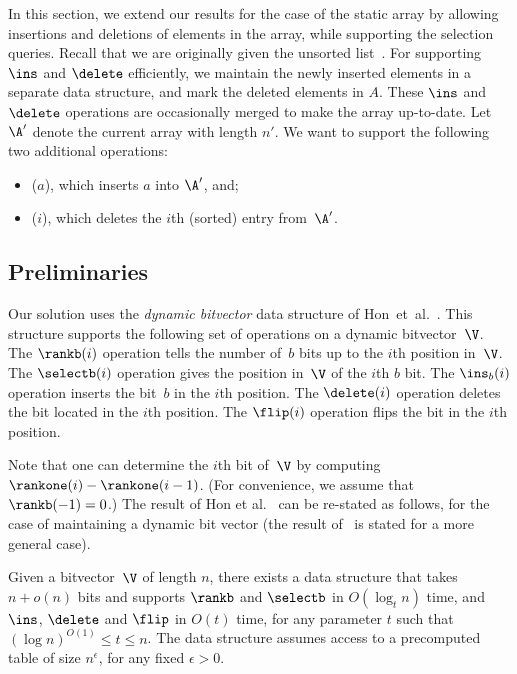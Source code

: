 In this section, we extend our results for the case of the static array by allowing 
insertions and deletions of elements in the array, while supporting the selection 
queries. Recall that we are originally given the unsorted list~\A. 
For supporting $\ins$ and $\delete$ efficiently, we maintain the newly inserted elements in a
separate data structure, and mark the deleted elements in $A$. These $\ins$ and $\delete$ operations are 
occasionally merged to make the array up-to-date. 
Let $\A'$ denote the current array with length $n'$. We want to support the following 
two additional operations:
\begin{itemize}
	\item \ins($a$), which inserts $a$ into $\A'$, and;
	\item \del($i$), which deletes the $i$th (sorted) entry from~$\A'$.
\end{itemize}

\subsection{Preliminaries}
\label{section:dynamic-preliminaries}

Our solution uses the \emph{dynamic bitvector} data structure of Hon~et~al.~\cite{hon:dynamic-bitvector}. This structure supports the following set of operations on a dynamic bitvector~$\V$. 
The $\rankb(i)$ operation tells the number of~$b$ bits up to the $i$th position in~$\V$.
The $\selectb(i)$ operation gives the position in~$\V$ of the $i$th $b$ bit.
The $\ins_b(i)$ operation inserts the bit~$b$ in the $i$th position.
The $\delete(i)$ operation deletes the bit located in the $i$th position.
The $\flip(i)$ operation flips the bit in the $i$th position.


Note that one can determine the $i$th bit of~$\V$ by computing $\rankone(i) - \rankone(i-1)$. (For convenience, we assume that $\rankb(-1) = 0$.)
The result of Hon et al.~\cite[Theorem~1]{hon:dynamic-bitvector} can be re-stated as follows, for the case of maintaining a dynamic bit vector (the result of~\cite{hon:dynamic-bitvector} is stated
for a more general case).

\begin{lemma}
\label{lem:dynamic-bitvector}
Given a bitvector~$\V$ of length $n$, there exists a data structure that takes $n + o(n)$ bits and 
supports $\rankb$ and $\selectb$ in $O(\log_t n)$ time, and $\ins$, $\delete$ and $\flip$ in
$O(t)$ time, for any parameter $t$ such that $(\log n)^{O(1)} \le t \le n$. The data structure 
assumes access to a precomputed table of size $n^{\epsilon}$, for any fixed $\epsilon > 0$.
\end{lemma}

